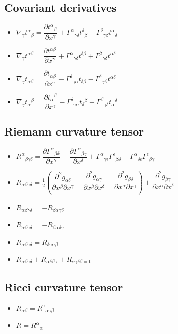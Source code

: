 \documentclass[]{report}
\newcommand \tab[1][1cm]{\hspace*{#1}}
\newcommand{\pp}[2]{\dfrac{\partial #1}{\partial #2}}
\newcommand{\itemt}{\item \tab}
\begin{document}
		\subsection{Covariant derivatives}
\begin{itemize}
\itemt \( \nabla_\gamma t^\alpha{}_\beta = \pp{t^\alpha{}_\beta}{x^\gamma} + \Gamma^\alpha{}_{\gamma\delta}t^\delta{}_\beta - \Gamma^\delta{}_{\gamma\beta}t^\alpha{}_\delta \)

\itemt \( \nabla_\gamma t^{\alpha\beta} = \pp{t^{\alpha\beta}}{x^\gamma} + \Gamma^\alpha{}_{\gamma\delta}t^{\delta\beta} + \Gamma^\beta{}_{\gamma\delta}t^{\alpha{}\delta} \)

\itemt \( \nabla_\gamma t_{\alpha\beta} = \pp{t_{\alpha\beta}}{x^\gamma} - \Gamma^\delta{}_{\gamma\alpha}t_{\delta\beta} - \Gamma^\delta{}_{\gamma\beta}t^{\alpha\delta} \)

\itemt \( \nabla_\gamma t_\alpha{}^\beta = \pp{t_\alpha{}^\beta}{x^\gamma} - \Gamma^\delta{}_{\gamma\alpha}t_\delta{}^\beta + \Gamma^\beta{}_{\gamma\delta}t_\alpha{}^\delta \)
\end{itemize}

		\subsection{Riemann curvature tensor}
\begin{itemize}
\itemt \( R^\alpha{}_{\beta\gamma\delta} = \pp{\Gamma^\alpha{}_{\beta\delta}}{x^\gamma} - \pp{\Gamma^\alpha{}_{\beta\gamma}}{x^\delta} + \Gamma^\alpha{}_{\gamma\epsilon}\Gamma^\epsilon{}_{\beta\delta} - \Gamma^\alpha{}_{\delta\epsilon}\Gamma^\epsilon{}_{\beta\gamma} \)

\itemt \( R_{\alpha\beta\gamma\delta} = \frac{1}{2}(\pp{^2g_{\alpha\delta}}{x^\beta \partial x^\gamma} - \pp{^2g_{\alpha\gamma}}{x^\beta \partial x^\delta} - \pp{^2g_{\beta\delta}}{x^\alpha \partial x^\gamma}) + \pp{^2g_{\beta\gamma}}{x^\alpha \partial x^\delta}\)

\itemt \( R_{\alpha\beta\gamma\delta} = -R_{\beta\alpha\gamma\delta} \)
\itemt \( R_{\alpha\beta\gamma\delta} = -R_{\beta\alpha\delta\gamma} \)
\itemt \( R_{\alpha\beta\gamma\delta} = R_{\delta\gamma\alpha\beta} \)
\itemt \( R_{\alpha\beta\gamma\delta} + R_{\alpha\delta\beta\gamma} + R_{\alpha\gamma\delta\beta = 0}\)

\end{itemize}

		\subsection{Ricci curvature tensor}
\begin{itemize}
\itemt \( R_{\alpha\beta} = R^\gamma{}_{\alpha\gamma\beta} \)
\itemt \( R = R^\alpha{}_\alpha  \)
\end{itemize}
\end{document}
